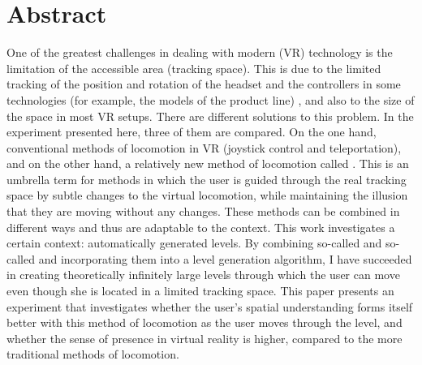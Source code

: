 \chapter*{Abstract}
One of the greatest challenges in dealing with modern  (VR) technology is the limitation of the accessible area (tracking space). This is due to the limited tracking of the position and rotation of the headset and the controllers in some technologies (for example, the models of the  product line)
, and also to the size of the space in most VR setups. There are different solutions to this problem. In the experiment presented here, three of them are compared. On the one hand, conventional methods of locomotion in VR (joystick control and teleportation), and on the other hand, a relatively new method of locomotion called . This is an umbrella term for methods in which the user is guided through the real tracking space by subtle changes to the virtual locomotion, while maintaining the illusion that they are moving without any changes. These methods can be combined in different ways and thus are adaptable to the context. This work investigates a certain context: automatically generated levels. By combining so-called  and so-called  and incorporating them into a level generation algorithm, I have succeeded in creating theoretically infinitely large levels through which the user can move even though she is located in a limited tracking space. This paper presents an experiment that investigates whether the user's spatial understanding forms itself better with this method of locomotion as the user moves through the level, and whether the sense of presence in virtual reality is higher, compared to the more traditional methods of locomotion. %